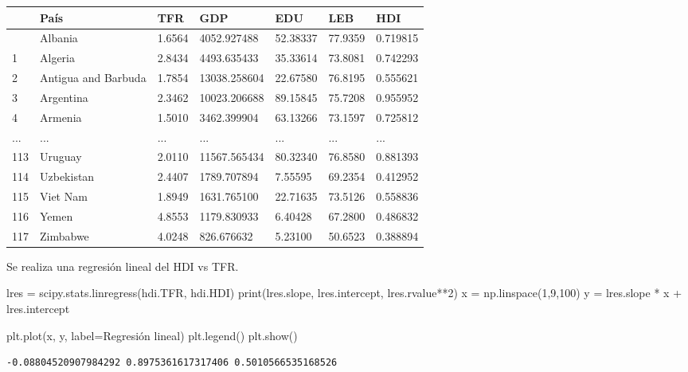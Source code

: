 \documentclass[
  letterpaper,
  DIV=11,
  numbers=noendperiod]{scrreprt}
\newenvironment{Shaded}{\begin{snugshade}}{\end{snugshade}}
\newcommand{\BuiltInTok}[1]{\textcolor[rgb]{0.00,0.23,0.31}{#1}}
\newcommand{\DecValTok}[1]{\textcolor[rgb]{0.68,0.00,0.00}{#1}}
\newcommand{\NormalTok}[1]{\textcolor[rgb]{0.00,0.23,0.31}{#1}}
\newcommand{\OperatorTok}[1]{\textcolor[rgb]{0.37,0.37,0.37}{#1}}
\newcommand{\StringTok}[1]{\textcolor[rgb]{0.13,0.47,0.30}{#1}}
\begin{document}
\begin{longtable}[]{@{}lllllll@{}}
\toprule\noalign{}
& País & TFR & GDP & EDU & LEB & HDI \\
\midrule\noalign{}
\endhead
\bottomrule\noalign{}
\endlastfoot
0 & Albania & 1.6564 & 4052.927488 & 52.38337 & 77.9359 & 0.719815 \\
1 & Algeria & 2.8434 & 4493.635433 & 35.33614 & 73.8081 & 0.742293 \\
2 & Antigua and Barbuda & 1.7854 & 13038.258604 & 22.67580 & 76.8195 &
0.555621 \\
3 & Argentina & 2.3462 & 10023.206688 & 89.15845 & 75.7208 & 0.955952 \\
4 & Armenia & 1.5010 & 3462.399904 & 63.13266 & 73.1597 & 0.725812 \\
... & ... & ... & ... & ... & ... & ... \\
113 & Uruguay & 2.0110 & 11567.565434 & 80.32340 & 76.8580 & 0.881393 \\
114 & Uzbekistan & 2.4407 & 1789.707894 & 7.55595 & 69.2354 &
0.412952 \\
115 & Viet Nam & 1.8949 & 1631.765100 & 22.71635 & 73.5126 & 0.558836 \\
116 & Yemen & 4.8553 & 1179.830933 & 6.40428 & 67.2800 & 0.486832 \\
117 & Zimbabwe & 4.0248 & 826.676632 & 5.23100 & 50.6523 & 0.388894 \\
\end{longtable}

Se realiza una regresión lineal del HDI vs TFR.

\begin{Shaded}
\begin{Highlighting}[]
\NormalTok{lres }\OperatorTok{=}\NormalTok{ scipy.stats.linregress(hdi.TFR, hdi.HDI)}
\BuiltInTok{print}\NormalTok{(lres.slope, lres.intercept, lres.rvalue}\OperatorTok{**}\DecValTok{2}\NormalTok{)}
\NormalTok{x }\OperatorTok{=}\NormalTok{ np.linspace(}\DecValTok{1}\NormalTok{,}\DecValTok{9}\NormalTok{,}\DecValTok{100}\NormalTok{)}
\NormalTok{y }\OperatorTok{=}\NormalTok{ lres.slope }\OperatorTok{*}\NormalTok{ x }\OperatorTok{+}\NormalTok{ lres.intercept}

\NormalTok{plt.plot(x, y, label}\OperatorTok{=}\StringTok{\textquotesingle{}Regresión lineal\textquotesingle{}}\NormalTok{)}
\NormalTok{plt.legend()}
\NormalTok{plt.show()}
\end{Highlighting}
\end{Shaded}

\begin{verbatim}
-0.08804520907984292 0.8975361617317406 0.5010566535168526
\end{verbatim}
\end{document}
